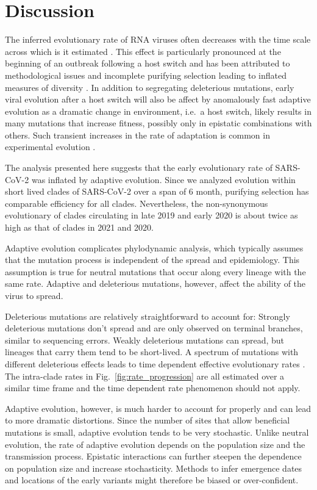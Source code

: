 \documentclass[aps,rmp, twocolumn]{revtex4}
\begin{document}
\section*{Discussion}
The inferred evolutionary rate of RNA viruses often decreases with the time scale across which is it estimated \citep{wertheim_purifying_2011,ghafari_prisoner_2021}.
This effect is particularly pronounced at the beginning of an outbreak following a host switch and has been attributed to methodological issues and incomplete purifying selection leading to inflated measures of diversity \citep{meyer_time_2015,ghafari_purifying_2022}.
In addition to segregating deleterious mutations, early viral evolution after a host switch will also be affect by anomalously fast adaptive evolution as a dramatic change in environment, i.e.~a host switch, likely results in many mutations that increase fitness, possibly only in epistatic combinations with others.
Such transient increases in the rate of adaptation is common in experimental evolution \citep{elena_virus_2007}.

The analysis presented here suggests that the early evolutionary rate of SARS-CoV-2 was inflated by adaptive evolution.
Since we analyzed evolution within short lived clades of SARS-CoV-2 over a span of 6 month, purifying selection has comparable efficiency for all clades.
Nevertheless, the non-synonymous evolutionary of clades circulating in late 2019 and early 2020 is about twice as high as that of clades in 2021 and 2020.

Adaptive evolution complicates phylodynamic analysis, which typically assumes that the mutation process is independent of the spread and epidemiology.
This assumption is true for neutral mutations that occur along every lineage with the same rate.
Adaptive and deleterious mutations, however, affect the ability of the virus to spread.

Deleterious mutations are relatively straightforward to account for: Strongly deleterious mutations don't spread and are only observed on terminal branches, similar to sequencing errors.
Weakly deleterious mutations can spread, but lineages that carry them tend to be short-lived.
A spectrum of mutations with different deleterious effects leads to time dependent effective evolutionary rates \citep{wertheim_purifying_2011}.
The intra-clade rates in Fig.~\ref{fig:rate_progression} are all estimated over a similar time frame and the time dependent rate phenomenon should not apply.

Adaptive evolution, however, is much harder to account for properly and can lead to more dramatic distortions.
Since the number of sites that allow beneficial mutations is small, adaptive evolution tends to be very stochastic.
Unlike neutral evolution, the rate of adaptive evolution depends on the population size and the transmission process.
Epistatic interactions can further steepen the dependence on population size and increase stochasticity.
Methods to infer emergence dates and locations of the early variants might therefore be biased or over-confident.





\appendix



\end{document}
